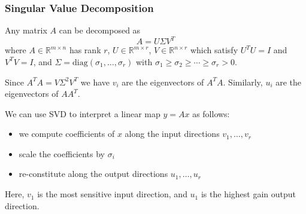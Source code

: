 \documentclass[11pt]{article}
\begin{document}
\subsubsection*{Singular Value Decomposition} 
Any matrix $A$ can be decomposed as 
\[ A = U\Sigma V^T \] 
where $A \in \mathbb{R}^{m\times n}$ has rank $r$, $U \in \mathbb{R}^{m\times r}$, $V \in \mathbb{R}^{n\times r}$ which satisfy $U^TU = I$ and $V^TV = I$, and $\Sigma = \mathrm{diag}(\sigma_1, \ldots, \sigma_r)$ with $\sigma_1 \geq \sigma_2 \geq \cdots \geq \sigma_r > 0$. \par 
Since $A^TA = V\Sigma^2V^T$ we have $v_i$ are the eigenvectors of $A^TA$. Similarly, $u_i$ are the eigenvectors of $AA^T$. \par 
We can use SVD to interpret a linear map $y = Ax$ as follows: 
\begin{itemize}
    \item we compute coefficients of $x$ along the input directions $v_1, \ldots, v_r$
    \item scale the coefficients by $\sigma_i$
    \item re-constitute along the output directions $u_1, \ldots, u_r$
\end{itemize}
Here, $v_1$ is the most sensitive input direction, and $u_1$ is the highest gain output direction. 
\end{document}
